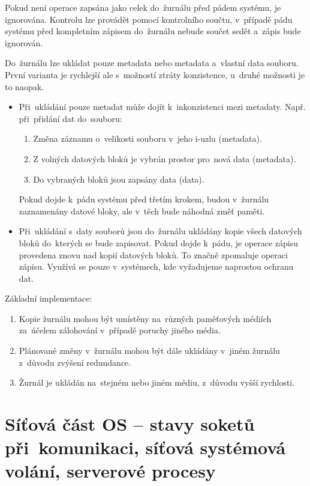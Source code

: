 Pokud není operace zapsána jako celek do~žurnálu před pádem systému, je ignorována. Kontrolu lze provádět pomocí kontrolního součtu, v~případě pádu systému před kompletním zápisem do~žurnálu nebude součet sedět a~zápis bude ignorován.

Do~žurnálu lze ukládat pouze metadata nebo metadata a~vlastní data souboru. První varianta je rychlejší ale s~možností ztráty konzistence, u~druhé možnosti je to naopak.

\begin{itemize}
	\item Při~ukládání pouze metadat může dojít k~inkonzistenci mezi metadaty. Např. při~přidání dat do~souboru:
	\begin{enumerate}
		\item Změna záznamu o~velikosti souboru v~jeho i-uzlu (metadata).
		\item Z volných datových bloků je vybrán prostor pro~nová data (metadata).
		\item Do vybraných bloků jsou zapsány data (data).
	\end{enumerate}
	Pokud dojde k~pádu systému před třetím krokem, budou v~žurnálu zaznamenány datové bloky, ale v~těch bude náhodná změť paměti.
	\item Při~ukládání s~daty souborů jsou do~žurnálu ukládány kopie všech datových bloků do~kterých se bude zapisovat. Pokud dojde k~pádu, je operace zápisu provedena znovu nad kopií datových bloků. To značně zpomaluje operaci zápisu. Využívá se pouze v~systémech, kde vyžadujeme naprostou ochranu dat.
\end{itemize}

Základní implementace:

\begin{enumerate}
	\item Kopie žurnálu mohou být umístěny na~různých paměťových médiích za~účelem zálohování v~případě poruchy jiného média.
	\item Plánované změny v~žurnálu mohou být dále ukládány v~jiném žurnálu z~důvodu zvýšení redundance.
	\item Žurnál je ukládán na~stejném nebo jiném médiu, z~důvodu vyšší rychlosti.
\end{enumerate}


\clearpage
\section{Síťová část OS -- stavy soketů při~komunikaci, síťová systémová volání, serverové procesy}


